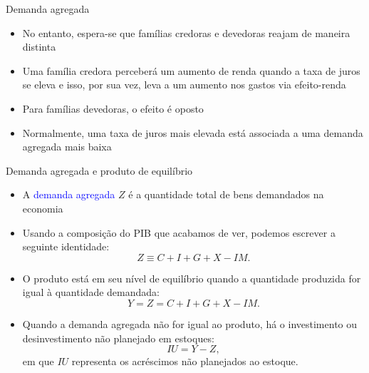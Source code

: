 \documentclass[10pt]{beamer}
\begin{document}
\begin{frame}{Demanda agregada}
    \begin{itemize}
        \item No entanto, espera-se que famílias credoras e devedoras reajam de maneira distinta\bigskip
         
        \item Uma família credora perceberá um aumento de renda quando a taxa de juros se eleva e isso, por sua vez, leva a um aumento nos gastos via efeito-renda\bigskip
         
        \item Para famílias devedoras, o efeito é oposto\bigskip
         
        \item Normalmente, uma taxa de juros mais elevada está associada a uma demanda agregada mais baixa
    \end{itemize}
\end{frame}

\begin{frame}{Demanda agregada e produto de equilíbrio}
    \begin{itemize}
        \item A \textcolor{blue}{demanda agregada} $Z$ é a quantidade total de bens demandados na economia\bigskip
         
        \item Usando a composição do PIB que acabamos de ver, podemos escrever a seguinte identidade:
        \begin{equation}
            Z \equiv C + I + G + X - IM.
        \end{equation}
         
        \item O produto está em seu nível de equilíbrio quando a quantidade produzida for igual à quantidade demandada:
        \begin{equation}
            Y = Z = C + I + G + X - IM.
        \end{equation}
         
        \item Quando a demanda agregada não for igual ao produto, há o investimento ou desinvestimento não planejado em estoques:
        \begin{equation}
            IU = Y - Z,
        \end{equation}
        em que $IU$ representa os acréscimos não planejados ao estoque.
    \end{itemize}
\end{frame}
\end{document}
